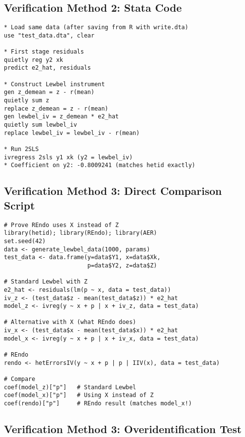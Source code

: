 \documentclass[12pt]{article}
\begin{document}
\subsection{Verification Method 2: Stata Code}

\begin{lstlisting}[caption={Stata code producing identical results}]
* Load same data (after saving from R with write.dta)
use "test_data.dta", clear

* First stage residuals
quietly reg y2 xk
predict e2_hat, residuals

* Construct Lewbel instrument
gen z_demean = z - r(mean)
quietly sum z
replace z_demean = z - r(mean)
gen lewbel_iv = z_demean * e2_hat
quietly sum lewbel_iv
replace lewbel_iv = lewbel_iv - r(mean)

* Run 2SLS
ivregress 2sls y1 xk (y2 = lewbel_iv)
* Coefficient on y2: -0.8009241 (matches hetid exactly)
\end{lstlisting}

\subsection{Verification Method 3: Direct Comparison Script}

\begin{lstlisting}[caption={Complete verification showing REndo uses X not Z}]
# Prove REndo uses X instead of Z
library(hetid); library(REndo); library(AER)
set.seed(42)
data <- generate_lewbel_data(1000, params)
test_data <- data.frame(y=data$Y1, x=data$Xk, 
                        p=data$Y2, z=data$Z)

# Standard Lewbel with Z
e2_hat <- residuals(lm(p ~ x, data = test_data))
iv_z <- (test_data$z - mean(test_data$z)) * e2_hat
model_z <- ivreg(y ~ x + p | x + iv_z, data = test_data)

# Alternative with X (what REndo does)
iv_x <- (test_data$x - mean(test_data$x)) * e2_hat
model_x <- ivreg(y ~ x + p | x + iv_x, data = test_data)

# REndo
rendo <- hetErrorsIV(y ~ x + p | p | IIV(x), data = test_data)

# Compare
coef(model_z)["p"]   # Standard Lewbel
coef(model_x)["p"]   # Using X instead of Z
coef(rendo)["p"]     # REndo result (matches model_x!)
\end{lstlisting}

\subsection{Verification Method 3: Overidentification Test}
\end{document}
